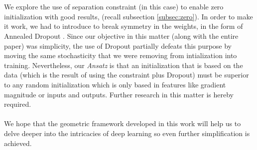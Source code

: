 \\\\
We explore the use of separation constraint (\SepUnitPoint in this case) to enable zero initialization with good results, (recall subsection \ref{subsec:zero}). In order to make it work, we had to introduce to break symmetry in the weights, in the form of Annealed Dropout \cite{dropoutAnnealing}. Since our objective in this matter (along with the entire paper) was simplicity, the use of Dropout partially defeats this purpose by moving the same stochasticity that we were removing from intialization into training. Nevertheless, our \emph{Ansatz} is that an initialization that is based on the data (which is the result of using the constraint plus Dropout) must be superior to any random initialization which is only based in features like gradient magnitude or inputs and outputs. Further research in this matter is hereby required.
\\\\
We hope that the geometric framework developed in this work will help us to delve deeper into the intricacies of deep learning so even further simplification is achieved. 




